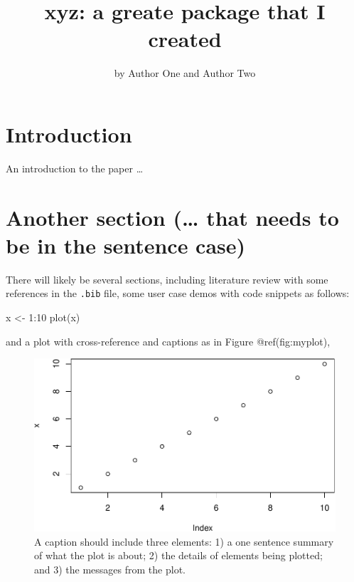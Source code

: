 \title{xyz: a greate package that I created}
\author{by Author One and Author Two}

\maketitle


\hypertarget{introduction}{%
\section{Introduction}\label{introduction}}

An introduction to the paper \ldots{}

\hypertarget{another-section-that-needs-to-be-in-the-sentence-case}{%
\section{Another section (\ldots{} that needs to be in the sentence
case)}\label{another-section-that-needs-to-be-in-the-sentence-case}}

There will likely be several sections, including literature review with
some references in the \texttt{.bib} file, some user case demos with
code snippets as follows:

\begin{Schunk}
\begin{Sinput}
x <- 1:10
plot(x)
\end{Sinput}
\end{Schunk}

and a plot with cross-reference and captions as in Figure
@ref(fig:myplot),

\begin{Schunk}
\begin{figure}
\includegraphics{sample-article_files/figure-latex/myplot-1} \caption[A caption should include three elements]{A caption should include three elements: 1) a one sentence summary of what the plot is about; 2) the details of elements being plotted; and 3) the messages from the plot.}\label{fig:myplot}
\end{figure}
\end{Schunk}

